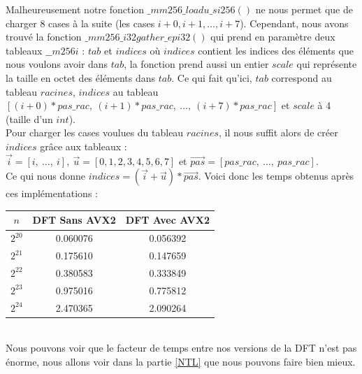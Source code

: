 \documentclass[12pt, a4paper]{article}
\begin{document}
Malheureusement notre fonction $\_mm256\_loadu\_si256()$ ne nous permet que de charger 8 cases à la suite (les cases $i+0, i+1,\dots,i+7$).
Cependant, nous avons trouvé la fonction $\_mm256\_i32gather\_epi32()$ qui prend en paramètre deux tableaux $\_\_m256i$ : $tab$ et $indices$ où $indices$ contient les indices des éléments que nous voulons avoir dans $tab$, la fonction prend aussi un entier $scale$ qui représente la taille en octet des éléments dans $tab$. Ce qui fait qu'ici, $tab$ correspond au tableau $racines$, $indices$ au tableau $[(i+0)*pas\_rac,\ (i+1)*pas\_rac,\ \dots,\ (i+7)*pas\_rac]$ et $scale$ à 4 (taille d'un $int$).\\
\indent Pour charger les cases voulues du tableau $racines$, il nous suffit alors de créer $indices$ grâce aux tableaux : \\ $\overrightarrow{i} = [i,\ \dots,\ i],\  \overrightarrow{u} = [0, 1, 2, 3, 4, 5, 6, 7]$ et $ \overrightarrow{pas} = [pas\_rac,\ \dots,\ pas\_rac]$. \\
Ce qui nous donne $indices = (\overrightarrow{i}+\overrightarrow{u})*\overrightarrow{pas}$.
\newpage	
Voici donc les temps obtenus après ces implémentations :

\begin{center}
\begin{tabular}{||c c c||}
\hline
$n$ & DFT Sans AVX2 & DFT Avec AVX2 \\
\hline\hline
$2^{20}$ & 0.060076 & 0.056392 \\
\hline
$2^{21}$ & 0.175610 & 0.147659 \\
\hline
$2^{22}$ & 0.380583 & 0.333849 \\
\hline
$2^{23}$ & 0.975016 & 0.775812 \\
\hline
$2^{24}$ & 2.470365 & 2.090264 \\
\hline
\end{tabular}
\end{center}
{}
\ \\
\indent Nous pouvons voir que le facteur de temps entre nos versions de la DFT n'est pas énorme, nous allons voir dans la partie \ref{NTL} que nous pouvons faire bien mieux.
\end{document}
